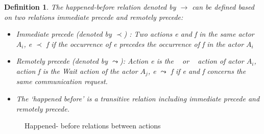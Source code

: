 \documentclass[a4paper,11pt]{article}
\theoremstyle{break}
\newtheorem{definition}{Definition}
\begin{document}
  \begin{definition}
  	\label{def:happedBefore1}
  The happened-before relation  denoted by  $\rightarrow $ can be defined based on two relations immediate precede and remotely precede: \begin{itemize}
  	\item Immediate precede (denoted by $ \prec$) :  Two actions e and f in the same actor $A_i$, e $ \prec$ f if the occurrence of e precedes the occurrence of f in the actor $A_i$  
  	\item Remotely precede (denoted by $\leadsto$): Action e is the \asynsend~ or \asynreceive~ action of actor $A_i$, action f is the Wait action of the actor $A_j$,  e $\leadsto$ f if e and f concerns the same communication request.
  	\item The ‘happened before’ is a transitive relation including immediate precede and remotely precede. 
  \end{itemize}\end{definition} 
  
 \begin{figure}[H]
\label{fig:hapend_before}
\hfill
{}
\caption{Happened- before relations between actions}
\end{figure}
\end{document}
